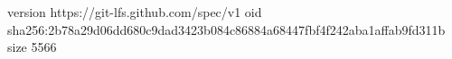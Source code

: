 version https://git-lfs.github.com/spec/v1
oid sha256:2b78a29d06dd680c9dad3423b084c86884a68447fbf4f242aba1affab9fd311b
size 5566
